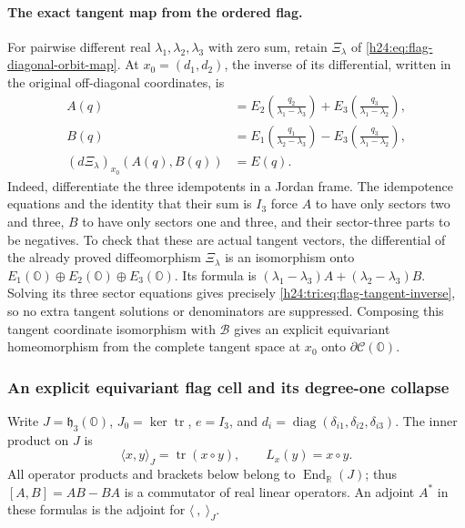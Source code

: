 \paragraph{The exact tangent map from the ordered flag.}
For pairwise different real \(\lambda_1,\lambda_2,\lambda_3\) with
zero sum, retain \(\Xi_\lambda\) of
\eqref{h24:eq:flag-diagonal-orbit-map}. At \(x_0=(d_1,d_2)\), the inverse
of its differential, written in the original off-diagonal coordinates, is
\begin{equation}
 \begin{aligned}
 A(q)&=E_2\left(\frac{q_2}{\lambda_1-\lambda_3}\right)
       +E_3\left(\frac{q_3}{\lambda_1-\lambda_2}\right),\\
 B(q)&=E_1\left(\frac{q_1}{\lambda_2-\lambda_3}\right)
       -E_3\left(\frac{q_3}{\lambda_1-\lambda_2}\right),\\
 (d\Xi_\lambda)_{x_0}(A(q),B(q))&=E(q).
 \end{aligned}
 \label{h24:tri:eq:flag-tangent-inverse}
\end{equation}
Indeed, differentiate the three idempotents in a Jordan frame. The
idempotence equations and the identity that their sum is \(I_3\)
force \(A\) to have only sectors two and three, \(B\) to have only
sectors one and three, and their sector-three parts to be negatives.
To check that these are actual tangent vectors, the differential of the
already proved diffeomorphism \(\Xi_\lambda\) is an isomorphism onto
\(E_1(\mathbb O)\oplus E_2(\mathbb O)\oplus E_3(\mathbb O)\).
Its formula is
\((\lambda_1-\lambda_3)A+(\lambda_2-\lambda_3)B\).
Solving its three sector equations gives precisely
\eqref{h24:tri:eq:flag-tangent-inverse}, so no extra tangent solutions or
denominators are suppressed. Composing this tangent coordinate
isomorphism with \(\mathcal B\) gives an explicit equivariant
homeomorphism from the complete tangent space at \(x_0\) onto
\(\partial\mathcal C(\mathbb O)\).


\subsubsection{An explicit equivariant flag cell and its degree-one collapse}
\label{h24:fc:section}

Write $J=\mathfrak h_3(\mathbb O)$, $J_0=\ker\operatorname{tr}$,
$e=I_3$, and $d_i=\operatorname{diag}(\delta_{i1},\delta_{i2},\delta_{i3})$.
The inner product on $J$ is
\[
 \langle x,y\rangle_J=\operatorname{tr}(x\circ y),\qquad
 L_x(y)=x\circ y.
\]
All operator products and brackets below belong to
$\operatorname{End}_{\mathbb R}(J)$; thus $[A,B]=AB-BA$ is a commutator
of real linear operators. An adjoint $A^*$ in these formulas is the
adjoint for $\langle\ ,\ \rangle_J$.

